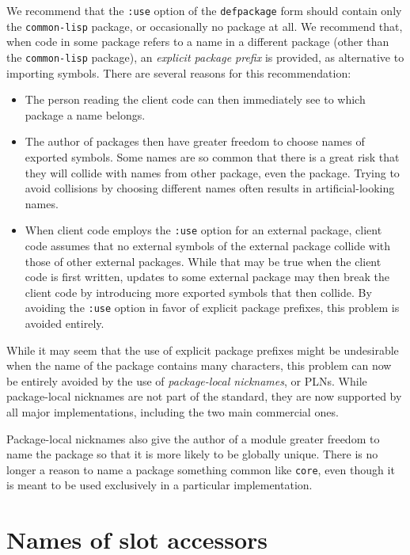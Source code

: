 We recommend that the \texttt{:use} option of the \texttt{defpackage}
form should contain only the \texttt{common-lisp} package, or
occasionally no package at all.  We recommend that, when code in some
package refers to a name in a different package (other than the
\texttt{common-lisp} package), an \emph{explicit package prefix} is
provided, as alternative to importing symbols.  There are several
reasons for this recommendation:

\begin{itemize}
\item The person reading the client code can then immediately see to
  which package a name belongs.
\item The author of packages then have greater freedom to choose names
  of exported symbols.  Some names are so common that there is a great
  risk that they will collide with names from other package, even the
  \commonlisp{} package.  Trying to avoid collisions by choosing
  different names often results in artificial-looking names.
\item When client code employs the \texttt{:use} option for an
  external package, client code assumes that no external symbols of
  the external package collide with those of other external packages.
  While that may be true when the client code is first written,
  updates to some external package may then break the client code by
  introducing more exported symbols that then collide.  By avoiding
  the \texttt{:use} option in favor of explicit package prefixes, this
  problem is avoided entirely.
\end{itemize}

While  it may seem that the use of explicit package prefixes might be
undesirable when the name of the package contains many characters,
this problem can now be entirely avoided by the use of
\emph{package-local nicknames}, or PLNs.  While package-local
nicknames are not part of the \commonlisp{} standard, they are now
supported by all major \commonlisp{} implementations, including the
two main commercial ones.

Package-local nicknames also give the author of a module greater
freedom to name the package so that it is more likely to be globally
unique.  There is no longer a reason to name a package something
common like \texttt{core}, even though it is meant to be used
exclusively in a particular implementation.

\section{Names of slot accessors}

